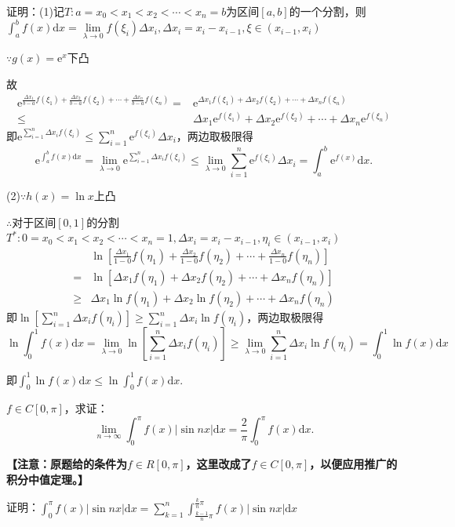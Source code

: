 \documentclass[12pt,UTF8]{ctexart}
\begin{document}
\begin{enumerate}
证明：(1)记$T:a=x_0<x_1<x_2<\cdots<x_n=b$为区间$[a,b]$的一个分割，则$\int_a^bf(x)\mathrm dx=\lim\limits_{\lambda\rightarrow0}f(\xi_i)\Delta x_i,\Delta x_i=x_i-x_{i-1},\xi\in(x_{i-1},x_i)$

$\because g(x)=\mathrm e^x$下凸

故
\[\begin{split}
\mathrm e^{\frac{\Delta x_1}{b-a}f(\xi_1)+\frac{\Delta x_2}{b-a}f(\xi_2)+\cdots+\frac{\Delta x_n}{b-a}f(\xi_n)}=&\mathrm e^{\Delta x_1f(\xi_1)+\Delta x_2f(\xi_2)+\cdots+\Delta x_nf(\xi_n)}\\
\leq&\Delta x_1\mathrm e^{f(\xi_1)}+\Delta x_2\mathrm e^{f(\xi_2)}+\cdots+\Delta x_n\mathrm e^{f(\xi_n)}\end{split}\]即$\mathrm e^{\sum_{i=1}^n\Delta x_if(\xi_i)}\leq\sum_{i=1}^n\mathrm e^{f(\xi_i)}\Delta x_i$，两边取极限得
\[
\mathrm e^{\int_a^bf(x)\mathrm dx}=\lim\limits_{\lambda\rightarrow0}\mathrm e^{\sum_{i=1}^n\Delta x_if(\xi_i)}\leq\lim\limits_{\lambda\rightarrow0}\sum_{i=1}^n\mathrm e^{f(\xi_i)}\Delta x_i=\int_a^b\mathrm e^{f(x)}\mathrm dx.
\]

(2)$\because h(x)=\ln x$上凸

$\therefore$对于区间$[0,1]$的分割$T^*:0=x_0<x_1<x_2<\cdots<x_n=1,\Delta x_i=x_i-x_{i-1},\eta_i\in(x_{i-1},x_i)$
\[\begin{split}
&\ln[\frac{\Delta x_1}{1-0}f(\eta_1)+\frac{\Delta x_2}{1-0}f(\eta_2)+\cdots+\frac{\Delta x_n}{1-0}f(\eta_n)]\\
=&\ln[\Delta x_1f(\eta_1)+\Delta x_2f(\eta_2)+\cdots+\Delta x_nf(\eta_n)]\\
\geq&\Delta x_1\ln f(\eta_1)+\Delta x_2\ln f(\eta_2)+\cdots+\Delta x_nf(\eta_n)
\end{split}\]
即$\ln[\sum_{i=1}^n\Delta x_if(\eta_i)]\geq\sum_{i=1}^n\Delta x_i\ln f(\eta_i)$，两边取极限得
\[
\ln\int_0^1f(x)\mathrm dx=\lim\limits_{\lambda\rightarrow0}\ln[\sum_{i=1}^n\Delta x_if(\eta_i)]\geq\lim\limits_{\lambda\rightarrow0}\sum_{i=1}^n\Delta x_i\ln f(\eta_i)=\int_0^1\ln f(x)\mathrm dx
\]

即$\int_0^1\ln f(x)\mathrm dx\leq\ln\int_0^1f(x)\mathrm dx$.

$f\in C[0,\pi]$，求证：
\[
\lim\limits_{n\rightarrow\infty}\int_0^{\pi}f(x)|\sin nx|\mathrm dx=\frac2\pi\int_0^\pi f(x)\mathrm dx.
\]

{\bf【注意：原题给的条件为$f\in R[0,\pi]$，这里改成了$f\in C[0,\pi]$，以便应用推广的积分中值定理。】}

证明：$\int_0^\pi f(x)|\sin nx|\mathrm dx=\sum_{k=1}^n\int_{\frac{k-1}n\pi}^{\frac kn\pi}f(x)|\sin nx|\mathrm dx$


\end{enumerate}
\end{document}

